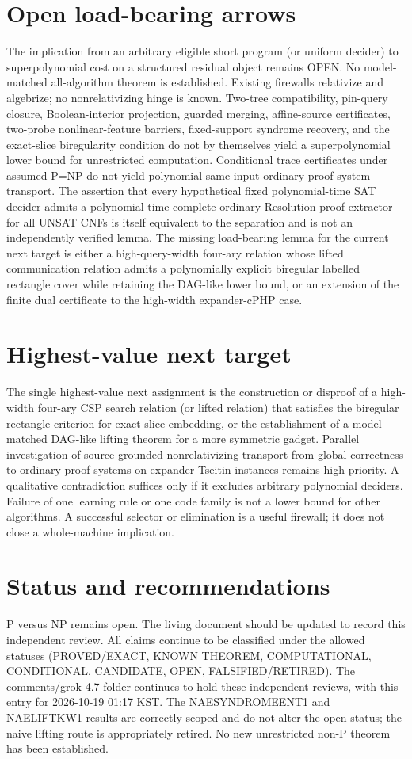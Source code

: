\documentclass[11pt]{article}
\begin{document}
\section{Open load-bearing arrows}
The implication from an arbitrary eligible short program (or uniform decider) to superpolynomial cost on a structured residual object remains OPEN. No model-matched all-algorithm theorem is established. Existing firewalls relativize and algebrize; no nonrelativizing hinge is known. Two-tree compatibility, pin-query closure, Boolean-interior projection, guarded merging, affine-source certificates, two-probe nonlinear-feature barriers, fixed-support syndrome recovery, and the exact-slice biregularity condition do not by themselves yield a superpolynomial lower bound for unrestricted computation. Conditional trace certificates under assumed P=NP do not yield polynomial same-input ordinary proof-system transport. The assertion that every hypothetical fixed polynomial-time SAT decider admits a polynomial-time complete ordinary Resolution proof extractor for all UNSAT CNFs is itself equivalent to the separation and is not an independently verified lemma. The missing load-bearing lemma for the current next target is either a high-query-width four-ary relation whose lifted communication relation admits a polynomially explicit biregular labelled rectangle cover while retaining the DAG-like lower bound, or an extension of the finite dual certificate to the high-width expander-cPHP case.

\section{Highest-value next target}
The single highest-value next assignment is the construction or disproof of a high-width four-ary CSP search relation (or lifted relation) that satisfies the biregular rectangle criterion for exact-slice embedding, or the establishment of a model-matched DAG-like lifting theorem for a more symmetric gadget. Parallel investigation of source-grounded nonrelativizing transport from global correctness to ordinary proof systems on expander-Tseitin instances remains high priority. A qualitative contradiction suffices only if it excludes arbitrary polynomial deciders. Failure of one learning rule or one code family is not a lower bound for other algorithms. A successful selector or elimination is a useful firewall; it does not close a whole-machine implication.

\section{Status and recommendations}
P versus NP remains open. The living document should be updated to record this independent review. All claims continue to be classified under the allowed statuses (PROVED/EXACT, KNOWN THEOREM, COMPUTATIONAL, CONDITIONAL, CANDIDATE, OPEN, FALSIFIED/RETIRED). The comments/grok-4.7 folder continues to hold these independent reviews, with this entry for 2026-10-19 01:17 KST. The NAESYNDROMEENT1 and NAELIFTKW1 results are correctly scoped and do not alter the open status; the naive lifting route is appropriately retired. No new unrestricted non-P theorem has been established.

\end{document}
